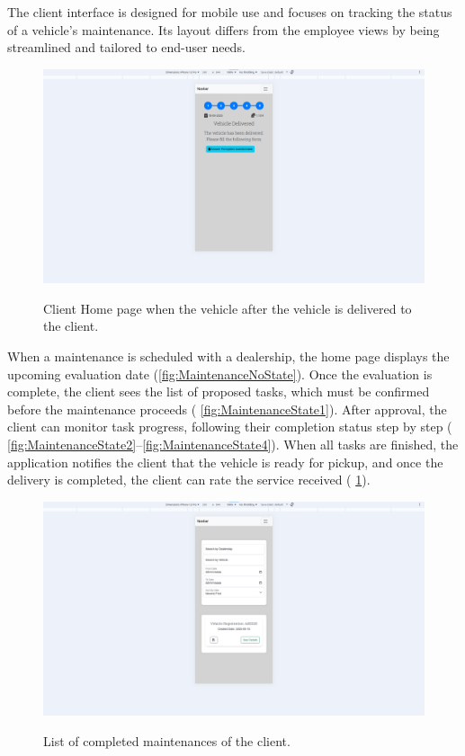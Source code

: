 The client interface is designed for mobile use and focuses on tracking the status of a vehicle's maintenance. Its layout differs from the employee views by being streamlined and tailored to end-user needs.




\begin{figure}[h]
  \caption{Client Home page when the vehicle after the vehicle is delivered to the client.}
  \centering
  \includegraphics[width=\textwidth]{figs/Implementation/client/MaintenanceState5}
  \label{fig:MaintenanceState5}
\end{figure}



When a maintenance is scheduled with a dealership, the home page displays the upcoming evaluation date (\ref{fig:MaintenanceNoState}). Once the evaluation is complete, the client sees the list of proposed tasks, which must be confirmed before the maintenance proceeds ( \ref{fig:MaintenanceState1}). After approval, the client can monitor task progress, following their completion status step by step ( \ref{fig:MaintenanceState2}–\ref{fig:MaintenanceState4}). When all tasks are finished, the application notifies the client that the vehicle is ready for pickup, and once the delivery is completed, the client can rate the service received ( \ref{fig:MaintenanceState5}).

\begin{figure}[h]
  \caption{List of completed maintenances of the client.}
  \centering
  \includegraphics[width=\textwidth]{figs/Implementation/client/MaintenanceHistory}
  \label{fig:clientMaintenanceHistory}
\end{figure}


